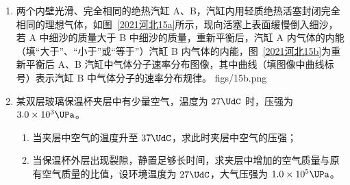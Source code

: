 \documentclass[\gkver]{gaokaozhenti}
\begin{document}
\begin{enumerate}
{（3）设粒子第一次经过电场加速，在负极板上方磁场区域偏转的轨迹半径为 $r_{0}$，若粒子在电场加速电压小于 $U_{\min}$，粒子穿过磁场在正极板下方磁场运动时，会被 OM 板吸收。则第一次出现能吸收到两种能量的位置（即 H 点），为粒子通过极板电压 $U_{\min}=\frac{7mv_{0}^{2}}{18q}$ 时，粒子第二次从上方打到负极板的位置（轨迹如图中蓝色线条所示）。由（2）的计算可知
$r_{1}=\frac{4mv_{0}}{3qB}$
则
$CH=4r-2r'=\frac{10mv_{0}}{3qB}$
极板电压大于 $U_{\min}=\frac{7mv_{0}^{2}}{18q}$ 时，粒子均不会被 OM 吸收，可以经过正极板下方磁场偏转，回到负极板上方磁场中，偏转后打在负极板上。则 H 点右方的点的粒子靶都可以接受到 $n$（$n\geqslant2$）种能量的粒子。即 $CS\to\infty$。
}

\item
两个内壁光滑、完全相同的绝热汽缸 A、B，汽缸内用轻质绝热活塞封闭完全相同的理想气体，如图~\ref{2021河北15a}所示，现向活塞上表面缓慢倒入细沙，若 A 中细沙的质量大于 B 中细沙的质量，重新平衡后，汽缸 A 内气体的内能（填“大于”、“小于”或“等于”）汽缸 B 内气体的内能，图~\ref{2021河北15b}为重新平衡后 A、B 汽缸中气体分子速率分布图像，其中曲线（填图像中曲线标号）表示汽缸 B 中气体分子的速率分布规律。
{figs/15b.png}


\item
某双层玻璃保温杯夹层中有少量空气，温度为 $27\UdC$ 时，压强为 $3.0\times10^{3}\UPa$。
\begin{enumerate}
	\item
	当夹层中空气的温度升至 $37\UdC$，求此时夹层中空气的压强；
	\item
	当保温杯外层出现裂隙，静置足够长时间，求夹层中增加的空气质量与原有空气质量的比值，设环境温度为 $27\UdC$，大气压强为 $1.0\times10^{5}\UPa$。
\end{enumerate}


\end{enumerate}
\end{document}
